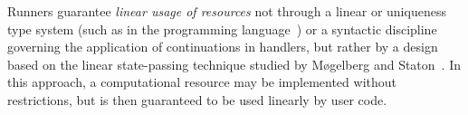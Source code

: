 Runners guarantee \emph{linear usage of resources} not through a linear or uniqueness type system (such as in the  programming language~\cite{Koopman:FPinClean}) or a syntactic discipline governing the application of continuations in handlers, but rather by a design based on the linear state-passing technique studied by Møgelberg and Staton~\cite{Mogelberg:LinearUsageOfState}.
In this approach, a computational resource may be implemented without restrictions, but is then guaranteed to be used linearly by user code.



